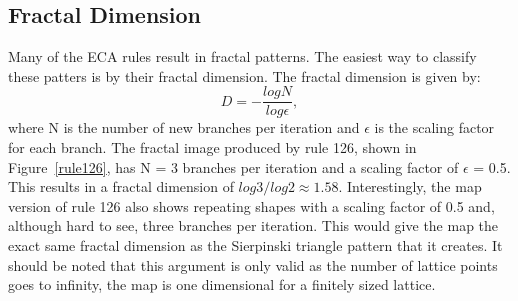 \subsection{Fractal Dimension}

Many of the ECA rules result in fractal patterns.  The easiest way to classify these patters is by their fractal dimension.  The fractal dimension is given by:
\begin{equation}
	D = - \frac{log N}{log \epsilon},
\end{equation}
where N is the number of new branches per iteration and $\epsilon$ is the scaling factor for each branch.  The fractal image produced by rule 126, shown in Figure~\ref{rule126}, has N = 3 branches per iteration and a scaling factor of $\epsilon$ = 0.5.  This results in a fractal dimension of $log 3/log 2 \approx 1.58$.  Interestingly, the map version of rule 126 also shows repeating shapes with a scaling factor of 0.5 and, although hard to see, three branches per iteration.  This would give the map the exact same fractal dimension as the Sierpinski triangle pattern that it creates.  It should be noted that this argument is only valid as the number of lattice points goes to infinity, the map is one dimensional for a finitely sized lattice.  
